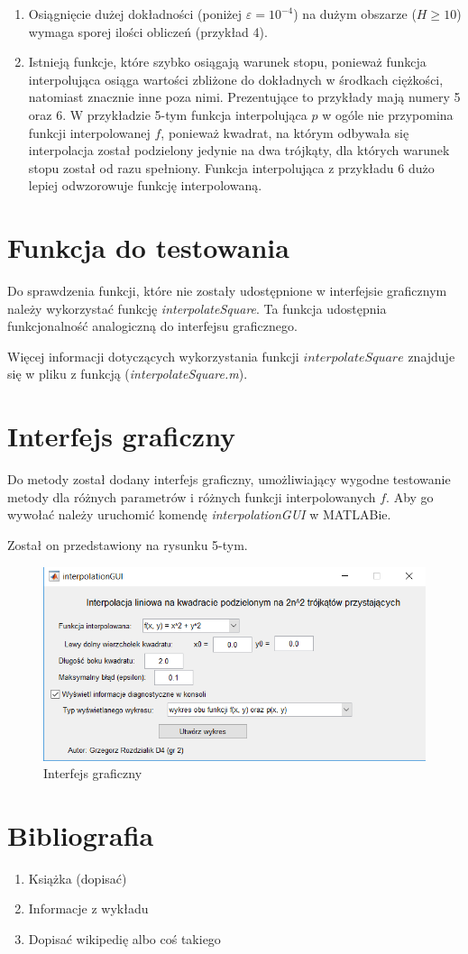 \documentclass[12pt]{article}
\begin{document}
\begin{enumerate}
		\item Osiągnięcie dużej dokładności (poniżej $\varepsilon = 10^{-4}$) na dużym obszarze ($H \geq 10$) wymaga sporej ilości obliczeń (przykład 4).
		
		\item Istnieją funkcje, które szybko osiągają warunek stopu, ponieważ funkcja interpolująca osiąga wartości zbliżone do dokładnych w środkach ciężkości, natomiast znacznie inne poza nimi. Prezentujące to przykłady mają numery 5 oraz 6. W przykładzie 5-tym funkcja interpolująca $p$ w ogóle nie przypomina funkcji interpolowanej $f$, ponieważ kwadrat, na którym odbywała się interpolacja został podzielony jedynie na dwa trójkąty, dla których warunek stopu został od razu spełniony. Funkcja interpolująca z przykładu 6 dużo lepiej odwzorowuje funkcję interpolowaną.
	\end{enumerate}

	\pagebreak
	
	\section{Funkcja do testowania}
	Do sprawdzenia funkcji, które nie zostały udostępnione w interfejsie graficznym należy wykorzystać funkcję \textit{interpolateSquare}. Ta funkcja udostępnia funkcjonalność analogiczną do interfejsu graficznego.
	
	Więcej informacji dotyczących wykorzystania funkcji $interpolateSquare$ znajduje się w pliku z funkcją (\textit{interpolateSquare.m}).
	
	\section{Interfejs graficzny}
	Do metody został dodany interfejs graficzny, umożliwiający wygodne testowanie metody dla różnych parametrów i różnych funkcji interpolowanych $f$. Aby go wywołać należy uruchomić komendę \textit{interpolationGUI} w MATLABie.
	
	Został on przedstawiony na rysunku 5-tym.
	
	\begin{figure}
		\centering
		\includegraphics[scale=1]{images/gui.png}
		\caption{Interfejs graficzny}
	\end{figure}
	
	\section{Bibliografia}
	\begin{enumerate}
		\item Książka (dopisać)
		\item Informacje z wykładu
		\item Dopisać wikipedię albo coś takiego
	\end{enumerate}
	
\end{document}
